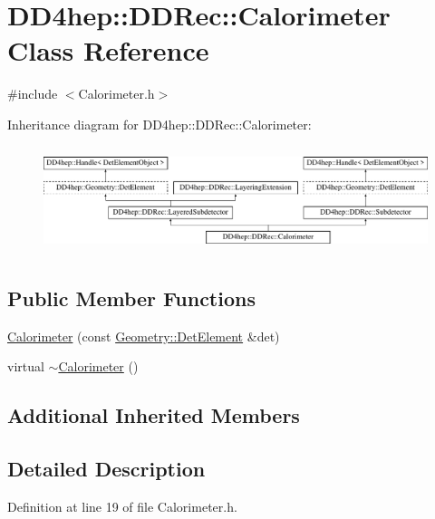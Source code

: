 \hypertarget{class_d_d4hep_1_1_d_d_rec_1_1_calorimeter}{}\section{D\+D4hep\+:\+:D\+D\+Rec\+:\+:Calorimeter Class Reference}
\label{class_d_d4hep_1_1_d_d_rec_1_1_calorimeter}


{\ttfamily \#include $<$Calorimeter.\+h$>$}

Inheritance diagram for D\+D4hep\+:\+:D\+D\+Rec\+:\+:Calorimeter\+:\begin{figure}[H]
\begin{center}
\leavevmode
\includegraphics[height=3.163842cm]{class_d_d4hep_1_1_d_d_rec_1_1_calorimeter}
\end{center}
\end{figure}
\subsection*{Public Member Functions}
\begin{DoxyCompactItemize}
\item 
\hyperlink{class_d_d4hep_1_1_d_d_rec_1_1_calorimeter_a143f17b7c2614d114c1b767122ac0516}{Calorimeter} (const \hyperlink{class_d_d4hep_1_1_geometry_1_1_det_element}{Geometry\+::\+Det\+Element} \&det)
\item 
virtual \hyperlink{class_d_d4hep_1_1_d_d_rec_1_1_calorimeter_a173a06cc2634725e660a04fa65b36c09}{$\sim$\+Calorimeter} ()
\end{DoxyCompactItemize}
\subsection*{Additional Inherited Members}


\subsection{Detailed Description}


Definition at line 19 of file Calorimeter.\+h.




